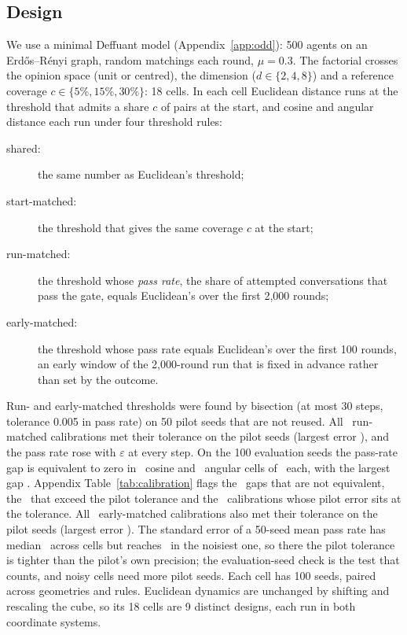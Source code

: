 \documentclass[11pt]{article}
\begin{document}
\subsection{Design}
We use a minimal Deffuant model (Appendix~\ref{app:odd}): 500 agents on an Erd\H{o}s--R\'enyi graph, random matchings each round, $\mu = 0.3$.
The factorial crosses the opinion space (unit or centred), the dimension ($d \in \{2,4,8\}$) and a reference coverage $c \in \{5\%, 15\%, 30\%\}$: 18 cells.
In each cell Euclidean distance runs at the threshold that admits a share $c$ of pairs at the start, and cosine and angular distance each run under four threshold rules:
\begin{description}
\item[shared:] the same number as Euclidean's threshold;
\item[start-matched:] the threshold that gives the same coverage $c$ at the start;
\item[run-matched:] the threshold whose \emph{pass rate}, the share of attempted conversations that pass the gate, equals Euclidean's over the first 2{,}000 rounds;
\item[early-matched:] the threshold whose pass rate equals Euclidean's over the first 100 rounds, an early window of the 2{,}000-round run that is fixed in advance rather than set by the outcome.
\end{description}
Run- and early-matched thresholds were found by bisection (at most 30 steps, tolerance 0.005 in pass rate) on 50 pilot seeds that are not reused.
All \VCalTotal\ run-matched calibrations met their tolerance on the pilot seeds (largest error \VCalMaxErr), and the pass rate rose with $\varepsilon$ at every step.
On the 100 evaluation seeds the pass-rate gap is equivalent to zero in \VCalEvalEquivCos\ cosine and \VCalEvalEquivAng\ angular cells of \VCellsPerGeom\ each, with the largest gap \VCalEvalMax.
Appendix Table~\ref{tab:calibration} flags the \VCalEvalMiss\ gaps that are not equivalent, the \VCalEvalBeyondTol\ that exceed the pilot tolerance and the \VCalAtTol\ calibrations whose pilot error sits at the tolerance.
All \VEarlyCalTotal\ early-matched calibrations also met their tolerance on the pilot seeds (largest error \VEarlyCalMaxErr).
The standard error of a 50-seed mean pass rate has median \VPilotSEMed\ across cells but reaches \VPilotSEMax\ in the noisiest one, so there the pilot tolerance is tighter than the pilot's own precision; the evaluation-seed check is the test that counts, and noisy cells need more pilot seeds.
Each cell has 100 seeds, paired across geometries and rules.
Euclidean dynamics are unchanged by shifting and rescaling the cube, so its 18 cells are 9 distinct designs, each run in both coordinate systems.
\end{document}

